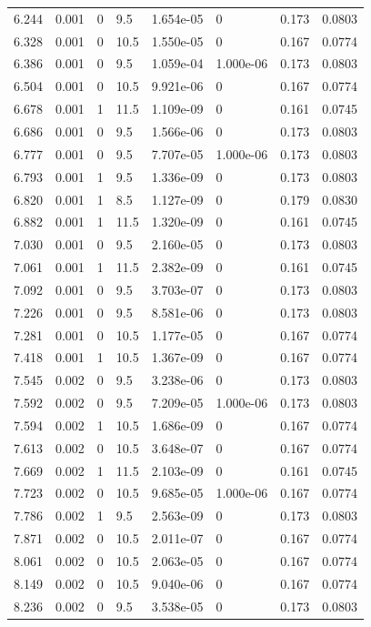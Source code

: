 \documentclass[preview]{standalone}
\begin{document}
{{{\begin{tabular}{L{1.2cm}C{1.2cm} C{0.3cm}C{0.5cm} C{1.4cm}C{1.4cm} C{1.4cm}C{1.4cm}}
  6.244  &  0.001  & 0     & 9.5 &  1.654e-05  & 0  & 0.173 &  0.0803   \\ 
  6.328  &  0.001  & 0     & 10.5 &  1.550e-05  & 0  & 0.167 &  0.0774   \\ 
  6.386  &  0.001  & 0     & 9.5 &  1.059e-04  & 1.000e-06  & 0.173 &  0.0803   \\ 
  6.504  &  0.001  & 0     & 10.5 &  9.921e-06  & 0  & 0.167 &  0.0774   \\ 
  6.678  &  0.001  & 1     & 11.5 &  1.109e-09  & 0  & 0.161 &  0.0745   \\ 
  6.686  &  0.001  & 0     & 9.5 &  1.566e-06  & 0  & 0.173 &  0.0803   \\ 
  6.777  &  0.001  & 0     & 9.5 &  7.707e-05  & 1.000e-06  & 0.173 &  0.0803   \\ 
  6.793  &  0.001  & 1     & 9.5 &  1.336e-09  & 0  & 0.173 &  0.0803   \\ 
  6.820  &  0.001  & 1     & 8.5 &  1.127e-09  & 0  & 0.179 &  0.0830   \\ 
  6.882  &  0.001  & 1     & 11.5 &  1.320e-09  & 0  & 0.161 &  0.0745   \\ 
  7.030  &  0.001  & 0     & 9.5 &  2.160e-05  & 0  & 0.173 &  0.0803   \\ 
  7.061  &  0.001  & 1     & 11.5 &  2.382e-09  & 0  & 0.161 &  0.0745   \\ 
  7.092  &  0.001  & 0     & 9.5 &  3.703e-07  & 0  & 0.173 &  0.0803   \\ 
  7.226  &  0.001  & 0     & 9.5 &  8.581e-06  & 0  & 0.173 &  0.0803   \\ 
  7.281  &  0.001  & 0     & 10.5 &  1.177e-05  & 0  & 0.167 &  0.0774   \\ 
  7.418  &  0.001  & 1     & 10.5 &  1.367e-09  & 0  & 0.167 &  0.0774   \\ 
  7.545  &  0.002  & 0     & 9.5 &  3.238e-06  & 0  & 0.173 &  0.0803   \\ 
  7.592  &  0.002  & 0     & 9.5 &  7.209e-05  & 1.000e-06  & 0.173 &  0.0803   \\ 
  7.594  &  0.002  & 1     & 10.5 &  1.686e-09  & 0  & 0.167 &  0.0774   \\ 
  7.613  &  0.002  & 0     & 10.5 &  3.648e-07  & 0  & 0.167 &  0.0774   \\ 
  7.669  &  0.002  & 1     & 11.5 &  2.103e-09  & 0  & 0.161 &  0.0745   \\ 
  7.723  &  0.002  & 0     & 10.5 &  9.685e-05  & 1.000e-06  & 0.167 &  0.0774   \\ 
  7.786  &  0.002  & 1     & 9.5 &  2.563e-09  & 0  & 0.173 &  0.0803   \\ 
  7.871  &  0.002  & 0     & 10.5 &  2.011e-07  & 0  & 0.167 &  0.0774   \\ 
  8.061  &  0.002  & 0     & 10.5 &  2.063e-05  & 0  & 0.167 &  0.0774   \\ 
  8.149  &  0.002  & 0     & 10.5 &  9.040e-06  & 0  & 0.167 &  0.0774   \\ 
  8.236  &  0.002  & 0     & 9.5 &  3.538e-05  & 0  & 0.173 &  0.0803   \\ 
\hline 
\end{tabular} 

}}}
\end{document}
